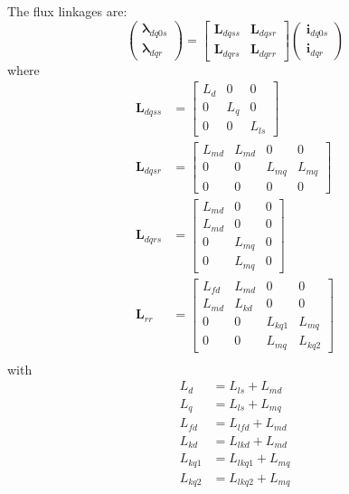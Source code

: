 %
The flux linkages are:
%
\begin{equation}
  \begin{pmatrix}
    \boldsymbol{\lambda}_{dq0s} \\
    \boldsymbol{\lambda}_{dqr}
  \end{pmatrix}
  =
  \begin{bmatrix}
    \mathbf{L}_{dqss} & \mathbf{L}_{dqsr} \\
    \mathbf{L}_{dqrs} & \mathbf{L}_{dqrr}    
  \end{bmatrix}
  \begin{pmatrix}
    \mathbf{i}_{dq0s} \\
    \mathbf{i}_{dqr}
  \end{pmatrix}
  \label{eq:flux}
\end{equation}
%
where
%
\begin{align}
  \mathbf{L}_{dqss} &= 
  \begin{bmatrix}
    L_{d} & 0 & 0 \\
    0 & L_{q} & 0 \\
    0 & 0 & L_{ls}
  \end{bmatrix} \\
  \mathbf{L}_{dqsr} &= 
  \begin{bmatrix}
    L_{md} & L_{md} & 0 & 0 \\
    0 & 0 & L_{mq} & L_{mq} \\
    0 & 0 & 0 & 0
  \end{bmatrix} \\
  \mathbf{L}_{dqrs} &=
  \begin{bmatrix}
    L_{md} & 0 & 0 \\
    L_{md} & 0 & 0 \\
    0 & L_{mq} & 0 \\
    0 & L_{mq} & 0 
  \end{bmatrix} \\
  \mathbf{L}_{rr} &=
  \begin{bmatrix}    
    L_{fd} & L_{md} & 0 & 0  \\
    L_{md} & L_{kd} & 0 & 0  \\
    0 & 0 & L_{kq1} & L_{mq} \\
    0 & 0 & L_{mq} & L_{kq2}
  \end{bmatrix} \\
\end{align}
%
with 
%
\begin{align}
  L_{d} &= L_{ls} + L_{md} \\
  L_{q} &= L_{ls} + L_{mq} \\   
  L_{fd} &= L_{lfd} + L_{md} \\
  L_{kd} &= L_{lkd} + L_{md} \\
  L_{kq1} &= L_{lkq1} + L_{mq} \\
  L_{kq2} &= L_{lkq2} + L_{mq}
\end{align}

